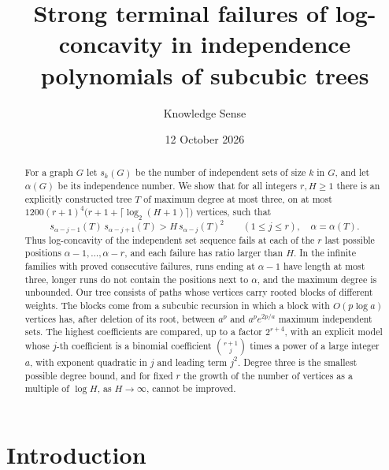 \documentclass[11pt]{amsart}
\theoremstyle{definition}
\theoremstyle{remark}
\numberwithin{equation}{section}
\begin{document}
\title[Terminal failures of log-concavity in subcubic trees]{Strong terminal failures of log-concavity in independence polynomials of subcubic trees}

\author{Knowledge Sense}
\address{Knowledge Sense}

\date{12 October 2026}



\begin{abstract}
For a graph $G$ let $s_k(G)$ be the number of independent sets of size $k$ in $G$, and let $\alpha(G)$ be its independence number. We show that for all integers $r,H\ge 1$ there is an explicitly constructed tree $T$ of maximum degree at most three, on at most ${1200(r+1)^4\bigl(r+1+\lceil\log_2(H+1)\rceil\bigr)}$ vertices, such that
\[
s_{\alpha-j-1}(T)\,s_{\alpha-j+1}(T)>H\,s_{\alpha-j}(T)^2\qquad(1\le j\le r),\quad \alpha=\alpha(T).
\]
Thus log-concavity of the independent set sequence fails at each of the $r$ last possible positions $\alpha-1,\dots,\alpha-r$, and each failure has ratio larger than $H$. In the infinite families with proved consecutive failures, runs ending at $\alpha-1$ have length at most three, longer runs do not contain the positions next to $\alpha$, and the maximum degree is unbounded. Our tree consists of paths whose vertices carry rooted blocks of different weights. The blocks come from a subcubic recursion in which a block with $O(p\log a)$ vertices has, after deletion of its root, between $a^p$ and $a^pe^{2p/a}$ maximum independent sets. The highest coefficients are compared, up to a factor $2^{r+4}$, with an explicit model whose $j$-th coefficient is a binomial coefficient $\binom{r+1}{j}$ times a power of a large integer $a$, with exponent quadratic in $j$ and leading term $j^2$. Degree three is the smallest possible degree bound, and for fixed $r$ the growth of the number of vertices as a multiple of $\log H$, as $H\to\infty$, cannot be improved.
\end{abstract}

\maketitle

\section{Introduction}
\end{document}
